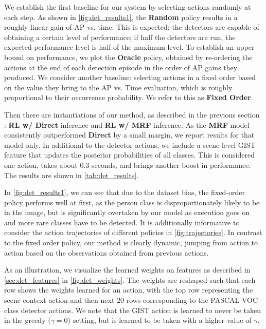 

We establish the first baseline for our system by selecting actions randomly at each step.
As shown in \autoref{fig:det_results1}, the \textbf{Random} policy results in a roughly linear gain of AP vs. time.
This is expected: the detectors are capable of obtaining a certain level of performance; if half the detectors are run, the expected performance level is half of the maximum level.
To establish an upper bound on performance, we plot the \textbf{Oracle} policy, obtained by re-ordering the actions at the end of each detection episode in the order of AP gains they produced.
We consider another baseline: selecting actions in a fixed order based on the value they bring to the AP vs. Time evaluation, which is roughly proportional to their occurrence probability.
We refer to this as \textbf{Fixed Order}.

Then there are instantiations of our method, as described in the previous section : \textbf{RL w/ Direct} inference and \textbf{RL w/ MRF} inference.
As the \textbf{MRF} model consistently outperformed \textbf{Direct} by a small margin, we report results for that model only.
In additional to the detector actions, we include a scene-level GIST feature that updates the posterior probabilities of all classes.
This is considered one action, takes about $0.3$ seconds, and brings another boost in performance.
The results are shown in \autoref{tab:det_results}.



In \autoref{fig:det_results1}, we can see that due to the dataset bias, the fixed-order policy performs well at first, as the person class is disproportionately likely to be in the image, but is significantly overtaken by our model as execution goes on and more rare classes have to be detected.
It is additionally informative to consider the action trajectories of different policies in \autoref{fig:trajectories}.
In contrast to the fixed order policy, our method is clearly dynamic, jumping from action to action based on the observations obtained from previous actions.



As an illustration, we visualize the learned weights on features as described in \autoref{sec:det_features} in \autoref{fig:det_weights}.
The weights are reshaped such that each row shows the weights learned for an action, with the top row representing the scene context action and then next $20$ rows corresponding to the PASCAL VOC class detector actions.
We note that the GIST action is learned to never be taken in the greedy ($\gamma=0$) setting, but is learned to be taken with a higher value of $\gamma$.

